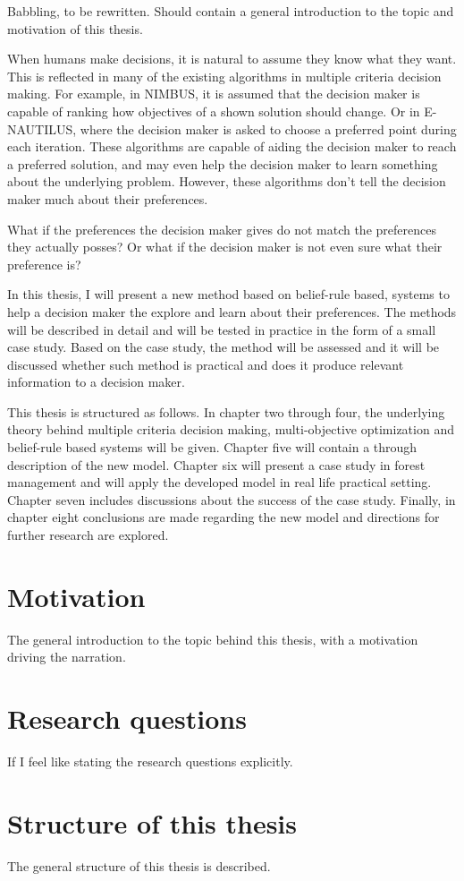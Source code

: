 {\color{red}
Babbling, to be rewritten. Should contain a general introduction to the topic and motivation of this thesis.
}

When humans make decisions, it is natural to assume they know what they want.
This is reflected in many of the existing algorithms in multiple criteria decision making.
For example, in NIMBUS, it is assumed that the decision maker is capable of ranking how objectives
of a shown solution should change. Or in E-NAUTILUS, where the decision maker is asked to choose
a preferred point during each iteration. These algorithms are capable of aiding the decision maker to 
reach a preferred solution, and may even help the decision maker to learn something about the
underlying problem. However, these algorithms don't tell the decision maker much about
their preferences.

What if the preferences the decision maker gives do not match the preferences they
actually posses? Or what if the decision maker is not even sure what their preference is?

In this thesis, I will present a new method based on belief-rule based, systems to help a decision maker
the explore and learn about their preferences. The methods will be described in detail and will be tested in
practice in the form of a small case study. Based on the case study, the method will be assessed and
it will be discussed whether such method is practical and does it produce relevant information to a
decision maker.

This thesis is structured as follows. In chapter two through four, the underlying theory behind multiple
criteria decision making, multi-objective optimization and belief-rule based systems will be given. Chapter
five will contain a through description of the new model. Chapter six will present a case study in forest
management and will apply the developed model in real life practical setting. Chapter seven includes
discussions about the success of the case study. Finally, in chapter eight conclusions are made regarding
the new model and directions for further research are explored.

\section{Motivation}
{\color{red}
The general introduction to the topic behind this thesis, with a motivation driving the narration.
}

\section{Research questions}
{\color{red}
If I feel like stating the research questions explicitly.
}

\section{Structure of this thesis}
{\color{red}
The general structure of this thesis is described.
}